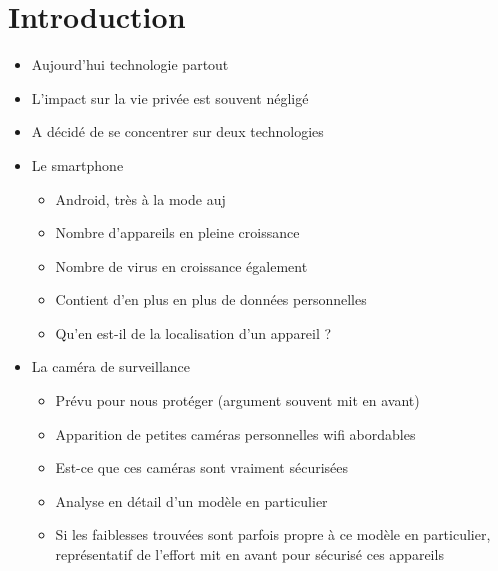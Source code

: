 \chapter*{Introduction}

\begin{itemize}
\item Aujourd'hui technologie partout
\item L'impact sur la vie privée est souvent négligé
\item A décidé de se concentrer sur deux technologies
\item Le smartphone
  \begin{itemize}
  \item Android, très à la mode auj
  \item Nombre d'appareils en pleine croissance
  \item Nombre de virus en croissance également
  \item Contient d'en plus en plus de données personnelles
  \item Qu'en est-il de la localisation d'un appareil ?
  \end{itemize}
\item La caméra de surveillance
  \begin{itemize}
  \item Prévu pour nous protéger (argument souvent mit en avant)
  \item Apparition de petites caméras personnelles wifi abordables
  \item Est-ce que ces caméras sont vraiment sécurisées
  \item Analyse en détail d'un modèle en particulier
  \item Si les faiblesses trouvées sont parfois propre à ce modèle en particulier, représentatif de l'effort mit en avant pour sécurisé ces appareils
  \end{itemize}
\end{itemize}